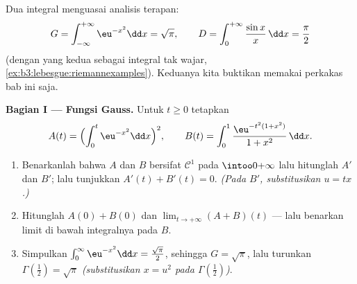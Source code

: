 \begin{problem}
\label{pb:b3:lebesgue:1}
Dua integral menguasai analisis terapan:
\[
G = \int_{-\infty}^{+\infty}\eu^{-x^2}\dd x = \sqrt\pi,
\qquad
D = \int_0^{+\infty}\frac{\sin x}{x}\,\dd x = \frac\pi2
\]
(dengan yang kedua sebagai integral tak wajar,
\cref{ex:b3:lebesgue:riemannexamples}). Keduanya kita buktikan memakai
perkakas bab ini saja.

\medskip
\noindent\textbf{Bagian I --- Fungsi Gauss.} Untuk $t \geq 0$ tetapkan
\[
A(t) = \Bigl(\int_0^t\eu^{-x^2}\dd x\Bigr)^{2},
\qquad
B(t) = \int_0^1\frac{\eu^{-t^2(1 + x^2)}}{1 + x^2}\,\dd x .
\]
\begin{enumerate}
  \item Benarkanlah bahwa $A$ dan $B$ bersifat $\mathcal C^1$ pada
        $\intoo0{+\infty}$ lalu hitunglah $A'$ dan $B'$; lalu tunjukkan
        $A'(t) + B'(t) = 0$. \emph{(Pada $B'$, substitusikan $u =
        tx$.)}
  \item Hitunglah $A(0) + B(0)$ dan $\lim_{t\to+\infty}(A + B)(t)$
        --- lalu benarkan limit di bawah integralnya pada $B$.
  \item Simpulkan $\int_0^\infty \eu^{-x^2}\dd x =
        \frac{\sqrt\pi}2$, sehingga $G = \sqrt\pi$, lalu turunkan
        $\Gamma(\tfrac12) = \sqrt\pi$ \emph{(substitusikan $x =
        u^2$ pada $\Gamma(\frac12)$)}.
\end{enumerate}


\end{problem}
